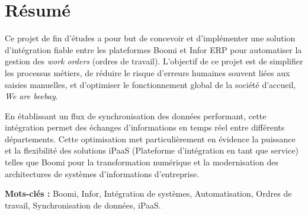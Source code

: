 \chapter*{Résumé}

Ce projet de fin d'études a pour but de concevoir et d'implémenter une solution d'intégration fiable entre les plateformes Boomi et Infor ERP pour automatiser la gestion des \textit{work orders} (ordres de travail). L'objectif de ce projet est de simplifier les processus métiers, de réduire le risque d'erreurs humaines souvent liées aux saisies manuelles, et d'optimiser le fonctionnement global de la société d'accueil, \textit{We are beebay}.

En établissant un flux de synchronisation des données performant, cette intégration permet des échanges d'informations en temps réel entre différents départements. Cette optimisation met particulièrement en évidence la puissance et la flexibilité des solutions iPaaS (Plateforme d'intégration en tant que service) telles que Boomi pour la transformation numérique et la modernisation des architectures de systèmes d'informations d'entreprise.

\vspace{1.5cm}

\textbf{Mots-clés :} Boomi, Infor, Intégration de systèmes, Automatisation, Ordres de travail, Synchronisation de données, iPaaS.
